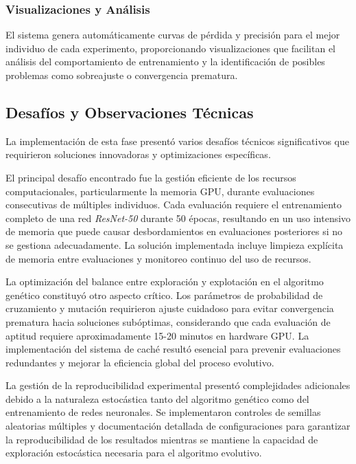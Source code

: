 \subsubsection{Visualizaciones y Análisis}

El sistema genera automáticamente curvas de pérdida y precisión para el mejor individuo de cada experimento, proporcionando visualizaciones que facilitan el análisis del comportamiento de entrenamiento y la identificación de posibles problemas como sobreajuste o convergencia prematura.

\subsection{Desafíos y Observaciones Técnicas}

La implementación de esta fase presentó varios desafíos técnicos significativos que requirieron soluciones innovadoras y optimizaciones específicas.

\vspace{5mm}

El principal desafío encontrado fue la gestión eficiente de los recursos computacionales, particularmente la memoria GPU, durante evaluaciones consecutivas de múltiples individuos. Cada evaluación requiere el entrenamiento completo de una red \emph{ResNet-50} durante 50 épocas, resultando en un uso intensivo de memoria que puede causar desbordamientos en evaluaciones posteriores si no se gestiona adecuadamente. La solución implementada incluye limpieza explícita de memoria entre evaluaciones y monitoreo continuo del uso de recursos.

\vspace{5mm}

La optimización del balance entre exploración y explotación en el algoritmo genético constituyó otro aspecto crítico. Los parámetros de probabilidad de cruzamiento y mutación requirieron ajuste cuidadoso para evitar convergencia prematura hacia soluciones subóptimas, considerando que cada evaluación de aptitud requiere aproximadamente 15-20 minutos en hardware GPU. La implementación del sistema de caché resultó esencial para prevenir evaluaciones redundantes y mejorar la eficiencia global del proceso evolutivo.

\vspace{5mm}

La gestión de la reproducibilidad experimental presentó complejidades adicionales debido a la naturaleza estocástica tanto del algoritmo genético como del entrenamiento de redes neuronales. Se implementaron controles de semillas aleatorias múltiples y documentación detallada de configuraciones para garantizar la reproducibilidad de los resultados mientras se mantiene la capacidad de exploración estocástica necesaria para el algoritmo evolutivo.

